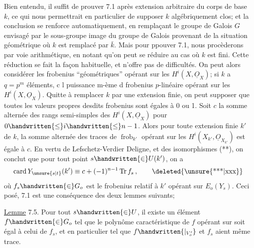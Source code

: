 Bien entendu, il suffit de prouver 7.1 après extension arbitraire du corps de base $k$, ce qui nous permettrait en particulier de supposer $k$ algébriquement clos; et la conclusion se renforce  automatiquement, en remplaçant le groupe de Galois $G$ envisagé par le sous-groupe image du groupe de Galois provenant de la situation géométrique où $k$ est remplacé par $\bar{k}$. Mais pour ppouver 7.1, nous procèderons  par voie arithmétique, en notant qu'on peut se réduire au cas où $k$ est fini. Cette réduction se fait  la façon habituelle, et n'offre pas de difficultés.  On peut alors considérer les frobenius ``géométriques'' opérant sur les $H^i(X,\underline{O}_X)$; si $k$ a $q=p^m$ éléments, c  l puissance m-ème d frobenius
$p$-linéaire opérant sur les $H^i(X,\underline{O}_X)$. Quitte à remplacer $k$ par une extension finie, on peut supposer que toutes les valeurs propres desdits frobenius sont égales à 0 ou 1. Soit $c$ la somme alternée  des rangs semi-simples des $H^i(X,\underline{O}_X)$ pour $0\handwritten{\leq}i\handwritten{\leq}n-1$. Alors pour toute extension finie $k'$ de $k$, la somme alternée des traces de $\operatorname{frob}_{k'}$ opérant sur les $H^i(X_{k'},\underline{O}_{X_{k'}})$ est  égale à $c$. En vertu de Lefschetz-Verdier Deligne, et des isomorphismes (**), on conclut que pour tout point $s\handwritten{\in}U(k')$, on a
\[
\operatorname{card}Y_{\unsure{s|t}}(k')\equiv c+(-1)^{n-1}\operatorname{Tr}f_s\,,
\tag*{\deleted{\unsure{***|xxx}}}
\]
où $f_s\handwritten{\in}G_o$ est  le frobenius relatif à $k'$ opérant sur $E_o(Y_s)$. Ceci posé, 7.1 est une conséquence des deux lemmes suivants;

\uline{Lemme} 7.5. Pour tout $s\handwritten{\in}U$, il existe un élément $f\handwritten{\in}G_o$  tel que le polynôme caractéristique de $f$ opérant sur  soit égal à celui de $f_s$, et en particulier tel que $f\handwritten{|_{V'_o}}$ et $f_s$ aient même trace.

